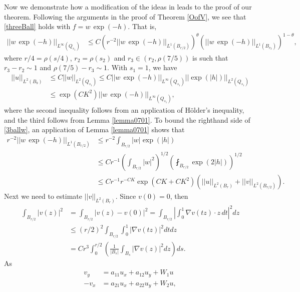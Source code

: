 \documentclass[12pt,reqno]{amsart}
\theoremstyle{plain}
\theoremstyle{definition}
\newcommand{\te}{\theta}
\newcommand{\iny}{\infty}
\newcommand{\gr}{\nabla}
\newcommand{\norm}[1]{\left\vert \left\vert #1\right\vert\right\vert}
\newcommand{\abs}[1]{\left\vert#1\right\vert}
\newcommand{\pr}[1]{\left( #1 \right) }
\begin{document}
Now we demonstrate how a modification of the ideas in \cite{KW15} leads to the proof of our theorem.
Following the arguments in the proof of Theorem \ref{OofV}, we see that \eqref{threeBall} holds with $f = w \, \exp\pr{-h}$.
That is,
\begin{align}
\norm{w \, \exp\pr{-h}}_{L^\iny\pr{Q_{s_1}}} 
&\le C \pr{r^{-2} \norm{w \, \exp\pr{-h}}_{L^1\pr{B_{r/2}}}}^\te 
\pr{\norm{w \, \exp\pr{-h}}_{L^1\pr{B_{r_3}}}}^{1 - \te},
\label{3ballw}
\end{align}
where $r/4 = \rho\pr{s/4}$, $r_2 = \rho\pr{s_2}$ and $r_3 \in \pr{r_2, \rho\pr{7/5}}$ is such that $r_3-r_2 \sim 1$ and $\rho\pr{7/5} - r_3 \sim 1$. 
With $s_1 = 1$, we have
\begin{align}
\norm{u}_{L^2\pr{B_{b}}} 
&\le C \norm{w}_{L^2\pr{Q_{s_1}}} 
\le C \norm{w \, \exp\pr{-h}}_{L^\iny\pr{Q_{s_1}}} \norm{\exp\pr{\abs{h}}}_{L^2\pr{Q_{s_1}}} \nonumber \\
&\le \exp(CK^2) \norm{w \, \exp\pr{-h}}_{L^\iny\pr{Q_{s_1}}},
\label{1ballEst}
\end{align}
where the second inequality follows from an application of H\"older's inequality, and the third follows from Lemma \ref{lemma0701}.
To bound the righthand side of \eqref{3ballw}, an application of Lemma \ref{lemma0701} shows that
\begin{align}
r^{-2} \norm{w \, \exp\pr{-h}}_{L^1\pr{B_{r/2}}}
&\le r^{-2} \int_{B_{r/2}} \abs{w} \exp\pr{\abs{h}} \nonumber \\
&\le C r^{-1} \pr{\int_{B_{r/2}} \abs{w}^2}^{1/2} \pr{\fint_{B_{r/2}}\exp\pr{2\abs{h}}}^{1/2} \nonumber \\
&\le C r^{-1} r^{-CK}\exp(CK+CK^2) \pr{ \norm{u}_{L^2\pr{B_r}} +  \norm{v}_{L^2\pr{B_{r/2}}}} .
\label{RHSEst}
\end{align}
Next we need to estimate $\norm{v}_{L^2\pr{B_r}}$.
Since $v\pr{0} = 0$, then
\begin{align}
\int_{B_{r/2}} \abs{v\pr{z}}^2
&= \int_{B_{r/2}} \abs{v\pr{z} - v\pr{0}}^2
= \int_{B_{r/2}} \abs{\int_0^1 \gr v\pr{t z} \cdot z \, dt}^2 dz \nonumber \\
&\le \pr{r/2}^2 \int_{B_{r/2}} \int_0^1 \abs{\gr v\pr{t z}}^2  dt dz \nonumber \\
&= Cr^3 \int_0^{r/2} \pr{\frac{1}{|B_s|}\int_{B_s}|\gr v\pr{z} |^2 dz } ds.
\label{L2vEst0}
\end{align}
As 
\begin{align*}
{v}_y &=  a_{11} u_x + a_{12}  u_y + W_1 u \\
-{v}_x &= a_{21} u_x + a_{22} u_y + W_2 u ,
\end{align*}
\end{document}
